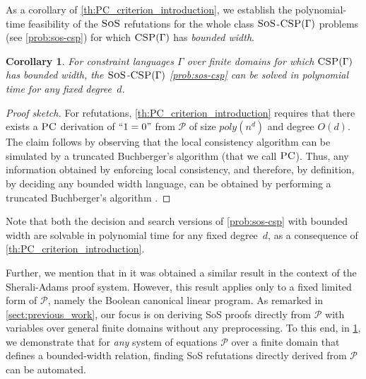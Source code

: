 \documentclass[11pt]{article}
\newcommand{\sos}{\text{\sc{SoS}}}
\newcommand{\CSP}{\textsc{CSP}}
\newcommand{\PC}{\textsc{PC}}
\newcommand{\1}{\textbf{1}}
\newtheorem{corollary}[theorem]{Corollary}
\begin{document}
As a corollary of \cref{th:PC_criterion_introduction}, we establish the polynomial-time feasibility of the $\sos$ refutations for the whole class $\sos$-$\CSP(\Gamma)$ problems (see \cref{prob:sos-csp}) for which $\CSP(\Gamma)$ has \emph{bounded width}. %
\begin{corollary}\label{th:BW}
    For constraint languages $\Gamma$ over finite domains for which $\CSP(\Gamma)$ has \emph{bounded width}, the $\sos$-$\CSP(\Gamma)$ \cref{prob:sos-csp} can be solved in polynomial time for any fixed degree~$d$.
\end{corollary}
\begin{proof}[Proof sketch]
    For refutations, \cref{th:PC_criterion_introduction} requires that there exists a $\PC$ derivation of $``1 = 0"$ from $\mathcal{P}$ of size $poly(n^d)$ and degree $O(d)$.
    The claim follows by observing that the local consistency algorithm can be simulated by a truncated Buchberger's algorithm (that we call $\PC$). Thus, any information obtained by enforcing local consistency{, and therefore, by definition, by deciding any bounded width language,} can be obtained by performing a truncated Buchberger's algorithm \cite{JeffersonJGD13,Bulatov23}.
\end{proof}

Note that both the decision and search versions of \cref{prob:sos-csp} with bounded width are solvable in polynomial time for any fixed degree~$d$, as a consequence of \cref{th:PC_criterion_introduction}.

Further, we mention that in \cite{ThapperZ18} it was obtained a similar result in the context of the Sherali-Adams proof system. However, this result applies only to a fixed limited form of $\mathcal{P}$, namely the Boolean canonical linear program. As remarked in \cref{sect:previous_work}, our focus is on deriving SoS proofs directly from $\mathcal{P}$ with variables over general finite domains without any preprocessing. To this end, in \cref{th:BW}, we demonstrate that for \emph{any} system of equations $\mathcal{P}$ over a finite domain that defines a bounded-width relation, finding SoS refutations directly derived from $\mathcal{P}$ can be automated.

\end{document}
